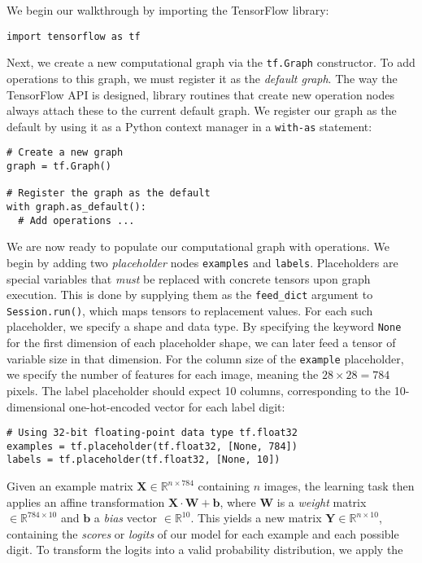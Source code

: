 We begin our walkthrough by importing the TensorFlow library:
%
\begin{lstlisting}
import tensorflow as tf
\end{lstlisting}
%
Next, we create a new computational graph via the \texttt{tf.Graph}
constructor. To add operations to this graph, we must register it as the
\emph{default graph}. The way the TensorFlow API is designed, library routines
that create new operation nodes always attach these to the current default
graph. We register our graph as the default by using it as a Python context
manager in a \texttt{with-as} statement:
%
\begin{lstlisting}
# Create a new graph
graph = tf.Graph()

# Register the graph as the default
with graph.as_default():
  # Add operations ...
\end{lstlisting}
%
We are now ready to populate our computational graph with operations. We begin
by adding two \emph{placeholder} nodes \texttt{examples} and
\texttt{labels}. Placeholders are special variables that \emph{must} be replaced
with concrete tensors upon graph execution. This is done by supplying them as
the \texttt{feed\_dict} argument to \texttt{Session.run()}, which maps tensors
to replacement values. For each such placeholder, we specify a shape and data
type. By specifying the keyword \texttt{None} for the first dimension of each
placeholder shape, we can later feed a tensor of variable size in that
dimension. For the column size of the \texttt{example} placeholder, we specify
the number of features for each image, meaning the $28 \times 28 = 784$
pixels. The label placeholder should expect 10 columns, corresponding to the
10-dimensional one-hot-encoded vector for each label digit:
%
\begin{lstlisting}
# Using 32-bit floating-point data type tf.float32
examples = tf.placeholder(tf.float32, [None, 784])
labels = tf.placeholder(tf.float32, [None, 10])
\end{lstlisting}
%
Given an example matrix $\mathbf{X} \in \mathbb{R}^{n \times 784}$ containing
$n$ images, the learning task then applies an affine transformation
$\mathbf{X} \cdot \mathbf{W} + \mathbf{b}$, where $\mathbf{W}$ is a
\emph{weight} matrix $\in \mathbb{R}^{784 \times 10}$ and $\mathbf{b}$ a
\emph{bias} vector $\in \mathbb{R}^{10}$. This yields a new matrix
$\mathbf{Y} \in \mathbb{R}^{n \times 10}$, containing the \emph{scores} or
\emph{logits} of our model for each example and each possible digit. To
transform the logits into a valid probability distribution, we apply the
